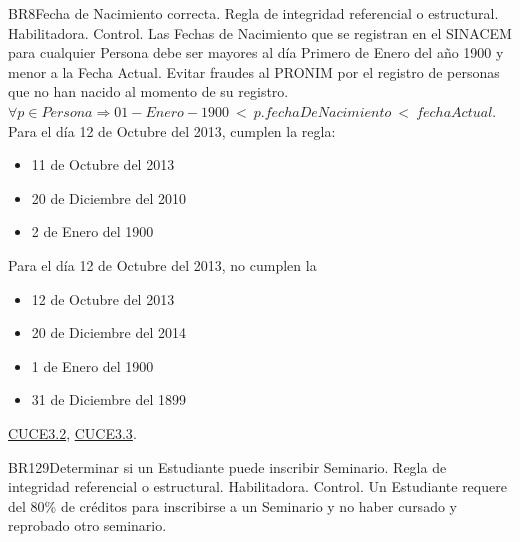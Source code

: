 \begin{BussinesRule}{BR8}{Fecha de Nacimiento correcta.}
	\BRitem[Tipo:] Regla de integridad referencial o estructural. 
	\BRitem[Clase:] Habilitadora. 
	\BRitem[Nivel:] Control. %
	\BRitem[Descripción:]	Las Fechas de Nacimiento que se registran en el SINACEM para cualquier Persona debe ser mayores al día Primero de Enero del año 1900 y menor a la Fecha Actual.
	\BRitem[Motivación:] Evitar fraudes al PRONIM por el registro de personas que no han nacido al momento de su registro.
	\BRitem[Sentencia:] $\forall p \in Persona \Rightarrow 01-Enero-1900~<~p.fechaDeNacimiento~<~fechaActual$.
	 Para el día 12 de Octubre del 2013, cumplen la regla: 		
        \begin{itemize}
        	\item 11 de Octubre del 2013
			\item 20 de Diciembre del 2010
			\item 2 de Enero del 1900
        \end{itemize}
	
	 Para el día 12 de Octubre del 2013, no cumplen la 
		\begin{itemize}
        	\item 12 de Octubre del 2013
			\item 20 de Diciembre del 2014
			\item 1 de Enero del 1900
			\item 31 de Diciembre del 1899
        \end{itemize}
	
	 \hyperlink{CUCE3.2}{CUCE3.2}, \hyperlink{CUCE3.3}{CUCE3.3}.
\end{BussinesRule}

\begin{BussinesRule}{BR129}{Determinar si un Estudiante puede inscribir Seminario.} 
	\BRitem[Tipo:] Regla de integridad referencial o estructural. 
	\BRitem[Clase:] Habilitadora. 
	\BRitem[Nivel:] Control. %
	\BRitem[Descripción:] Un Estudiante requere del 80\% de créditos para inscribirse a un Seminario y no haber cursado y reprobado otro seminario.
	
	
\end{BussinesRule}

